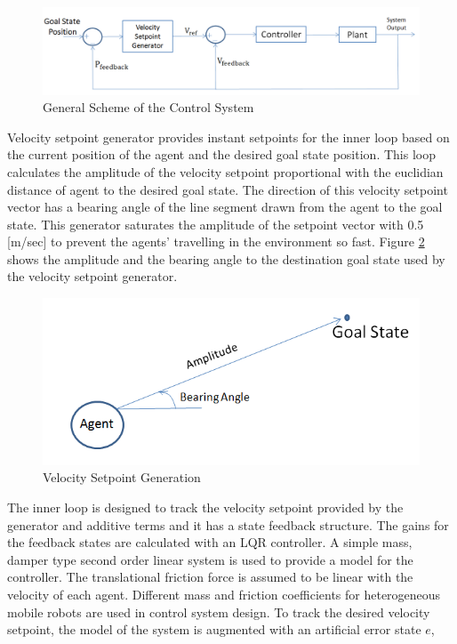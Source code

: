 \begin{figure}[H]
\caption{General Scheme of the Control System} \label{Controller_ref}
\centering
\includegraphics[scale = 0.45]{controller}
\end{figure}

Velocity setpoint generator provides instant setpoints for the inner loop based on the current position of the agent and the desired goal state position.  This loop calculates the amplitude of the velocity setpoint proportional with the euclidian distance of agent to the desired goal state. The direction of this velocity setpoint vector has a bearing angle of the line segment drawn from the agent to the goal state. This generator saturates the amplitude of the setpoint vector with 0.5 [m/sec] to prevent the agents' travelling in the environment so fast. Figure \ref{velocity_sp_generation} shows the amplitude and the bearing angle to the destination goal state used by the velocity setpoint generator.

\begin{figure}[H]
\caption{Velocity Setpoint Generation} \label{velocity_sp_generation}
\centering
\includegraphics[scale = 0.50]{bearing}
\end{figure}

The inner loop is designed to track the velocity setpoint provided by the generator and additive terms and it has a state feedback structure. The gains for the feedback states are calculated with an LQR controller. A simple mass, damper type second order linear system is used to provide a model for the controller. The translational friction force is assumed to be linear with the velocity of each agent. Different mass and friction coefficients for heterogeneous mobile robots are used in control system design. To track the desired velocity setpoint, the model of the system is augmented with an artificial error state $e$,

